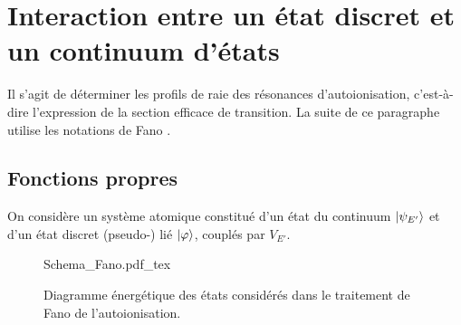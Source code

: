 \section{Interaction entre un état discret et un continuum d'états}
\label{sec:UniqueContinuum}
Il s'agit de déterminer les profils de raie des résonances d'autoionisation, c'est-à-dire l'expression de la section efficace de transition. La suite de ce paragraphe utilise les notations de Fano .
\subsection{Fonctions propres}
On considère un système atomique constitué d'un état du continuum $\ket{\psi_{E'}}$ et d'un état discret (pseudo-) lié $\ket{\varphi}$, couplés par $V_{E'}$.

\begin{figure}[h]
\centering
\def\svgwidth{0.5\textwidth}
{Schema_Fano.pdf_tex}
\caption{Diagramme énergétique des états considérés dans le traitement de Fano de l'autoionisation.}
\label{fig:Schema_Fano}
\end{figure}

